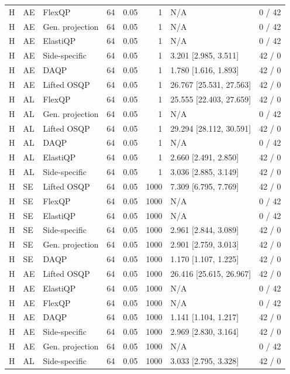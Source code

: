 \begin{longtable}{@{}lllrrrlr@{}}
H & AE & FlexQP & 64 & 0.05 & 1 & N/A & 0 / 42 \\
H & AE & Gen. projection & 64 & 0.05 & 1 & N/A & 0 / 42 \\
H & AE & ElastiQP & 64 & 0.05 & 1 & N/A & 0 / 42 \\
H & AE & Side-specific & 64 & 0.05 & 1 & 3.201 [2.985, 3.511] & 42 / 0 \\
H & AE & DAQP & 64 & 0.05 & 1 & 1.780 [1.616, 1.893] & 42 / 0 \\
H & AE & Lifted OSQP & 64 & 0.05 & 1 & 26.767 [25.531, 27.563] & 42 / 0 \\
H & AL & FlexQP & 64 & 0.05 & 1 & 25.555 [22.403, 27.659] & 42 / 0 \\
H & AL & Gen. projection & 64 & 0.05 & 1 & N/A & 0 / 42 \\
H & AL & Lifted OSQP & 64 & 0.05 & 1 & 29.294 [28.112, 30.591] & 42 / 0 \\
H & AL & DAQP & 64 & 0.05 & 1 & N/A & 0 / 42 \\
H & AL & ElastiQP & 64 & 0.05 & 1 & 2.660 [2.491, 2.850] & 42 / 0 \\
H & AL & Side-specific & 64 & 0.05 & 1 & 3.036 [2.885, 3.149] & 42 / 0 \\
H & SE & Lifted OSQP & 64 & 0.05 & 1000 & 7.309 [6.795, 7.769] & 42 / 0 \\
H & SE & FlexQP & 64 & 0.05 & 1000 & N/A & 0 / 42 \\
H & SE & ElastiQP & 64 & 0.05 & 1000 & N/A & 0 / 42 \\
H & SE & Side-specific & 64 & 0.05 & 1000 & 2.961 [2.844, 3.089] & 42 / 0 \\
H & SE & Gen. projection & 64 & 0.05 & 1000 & 2.901 [2.759, 3.013] & 42 / 0 \\
H & SE & DAQP & 64 & 0.05 & 1000 & 1.170 [1.107, 1.225] & 42 / 0 \\
H & AE & Lifted OSQP & 64 & 0.05 & 1000 & 26.416 [25.615, 26.967] & 42 / 0 \\
H & AE & ElastiQP & 64 & 0.05 & 1000 & N/A & 0 / 42 \\
H & AE & FlexQP & 64 & 0.05 & 1000 & N/A & 0 / 42 \\
H & AE & DAQP & 64 & 0.05 & 1000 & 1.141 [1.104, 1.217] & 42 / 0 \\
H & AE & Side-specific & 64 & 0.05 & 1000 & 2.969 [2.830, 3.164] & 42 / 0 \\
H & AE & Gen. projection & 64 & 0.05 & 1000 & N/A & 0 / 42 \\
H & AL & Side-specific & 64 & 0.05 & 1000 & 3.033 [2.795, 3.328] & 42 / 0 \\

\end{longtable}
